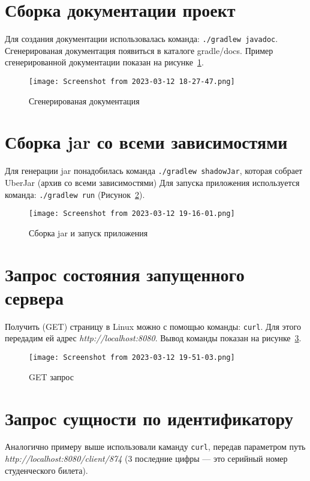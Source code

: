\section{Сборка документации проект}
Для создания документации использовалась команда: \texttt{./gradlew~javadoc}.
Сгенерированая документация появиться в каталоге gradle/docs.
Пример сгенерированной документации показан
на рисунке~\ref{fig:gradle:javadoc}.

\begin{figure}[h!tp]
	\centering
	\texttt{[image: Screenshot from 2023-03-12 18-27-47.png]}
	\caption{Сгенерированая документация}
	\label{fig:gradle:javadoc}
\end{figure}

\section{Сборка jar со всеми зависимостями}
Для генерации jar понадобилась команда \texttt{./gradlew shadowJar},
которая собрает UberJar (архив со всеми зависимостями)
Для запуска приложения используется команда: \texttt{./gradlew run}
(Рисунок~\ref{fig:gradle:run}).

\begin{figure}[h!tp]
	\centering
	\texttt{[image: Screenshot from 2023-03-12 19-16-01.png]}
	\caption{Сборка jar и запуск приложения}
	\label{fig:gradle:run}
\end{figure}

\section{Запрос состояния запущенного сервера}
Получить (GET) страницу в Linux можно с помощью команды: \texttt{curl}.
Для этого передадим ей адрес \textit{http://localhost:8080}.
Вывод команды показан на рисунке~\ref{fig:curl}.

\begin{figure}[h!tp]
	\centering
	\texttt{[image: Screenshot from 2023-03-12 19-51-03.png]}
	\caption{GET запрос}
	\label{fig:curl}
\end{figure}

\section{Запрос сущности по идентификатору}
Аналогично примеру выше использовали каманду \texttt{curl},
передав параметром путь \textit{http://localhost:8080/client/874}
(3 последние цифры --- это серийный номер студенческого билета).

